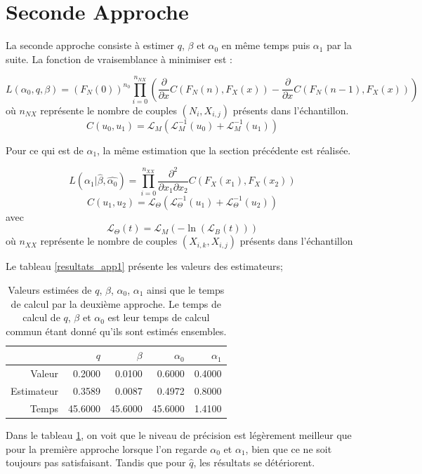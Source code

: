 \documentclass[11pt]{article}
\begin{document}
\section{Seconde Approche}

	La seconde approche consiste à estimer $q$, $\beta$ et $\alpha_{0}$ en même temps puis $\alpha_{1}$ par la suite. 
	La fonction de vraisemblance à minimiser est :
	
	
	\[ L(\alpha_{0},q,\beta) = (F_{N}(0))^{n_{0}} \prod^{n_{NX}}_{i=0} \left(\frac{\partial}{\partial x} C(F_{N}(n),F_{X}(x)) - \frac{\partial}{\partial x} C(F_{N}(n-1),F_{X}(x))\right) \]
	où $n_{NX}$ représente le nombre de couples $(N_{i},X_{i,j})$ présents dans l'échantillon.
	\[ C(u_{0},u_{1}) = \mathscr{L}_{M}(\mathscr{L}_{M}^{-1}(u_{0}) + \mathscr{L}_{M}^{-1}(u_{1}) ) \]
	
	Pour ce qui est de $\alpha_{1}$, la même estimation que la section précédente est réalisée.
	
	\[ L(\alpha_{1}\vert \hat{\beta},\hat{\alpha_{0}}) = \prod^{n_{XX}}_{i=0} \frac{\partial^{2}}{\partial x_{1}\partial x_{2}} C(F_{X}(x_{1}),F_{X}(x_{2}))  \]
	\[ C(u_{1},u_{2}) = \mathscr{L}_{\Theta}(\mathscr{L}_{\Theta}^{-1}(u_{1}) + \mathscr{L}_{\Theta}^{-1}(u_{2}) ) \]
	 avec    \[ \mathscr{L}_{\Theta}(t) = \mathscr{L}_{M}(-\ln(\mathscr{L}_{B}(t))) \]
	où $n_{XX}$ représente le nombre de couples $(X_{i,k},X_{i,j})$ présents dans l'échantillon

	Le tableau \ref{resultats_app1} présente les valeurs des estimateurs;

	\begin{table}[H]
		\centering
		\begin{tabular}{rrrrr}
		  \hline
		 	& $q$ & $\beta$ & $\alpha_{0}$ & $\alpha_{1}$ \\  
		  \hline
			Valeur & 0.2000 & 0.0100 & 0.6000 & 0.4000 \\ 
			Estimateur & 0.3589 & 0.0087 & 0.4972 & 0.8000 \\ 
			Temps & 45.6000 & 45.6000 & 45.6000 & 1.4100 \\ 
		   \hline
		\end{tabular}
	 		\caption{Valeurs estimées de $q$, $\beta$, $\alpha_{0}$, $\alpha_{1}$ ainsi que le temps de calcul par la deuxième approche. Le temps de calcul de $q$, $\beta$ et $\alpha_{0}$ est leur temps de calcul commun étant donné qu'ils sont estimés ensembles.}
	 	\label{resultats_app2}
	\end{table}

	Dans le tableau \ref{resultats_app2}, on voit que le niveau de précision est légèrement meilleur que pour la première approche lorsque l'on regarde $\alpha_{0}$ et $\alpha_{1}$, bien que ce ne soit toujours pas satisfaisant. Tandis que pour $\hat{q}$, les résultats se détériorent.
\end{document}
